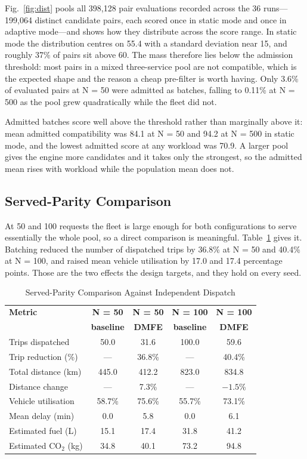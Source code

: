 \documentclass[conference]{IEEEtran}
\begin{document}
Fig.~\ref{fig:dist} pools all 398,128 pair evaluations recorded across the 36 runs---199,064 distinct candidate pairs, each scored once in static mode and once in adaptive mode---and shows how they distribute across the score range. In static mode the distribution centres on 55.4 with a standard deviation near 15, and roughly 37\% of pairs sit above 60. The mass therefore lies below the admission threshold: most pairs in a mixed three-service pool are not compatible, which is the expected shape and the reason a cheap pre-filter is worth having. Only 3.6\% of evaluated pairs at N = 50 were admitted as batches, falling to 0.11\% at N = 500 as the pool grew quadratically while the fleet did not.

Admitted batches score well above the threshold rather than marginally above it: mean admitted compatibility was 84.1 at N = 50 and 94.2 at N = 500 in static mode, and the lowest admitted score at any workload was 70.9. A larger pool gives the engine more candidates and it takes only the strongest, so the admitted mean rises with workload while the population mean does not.

\subsection{Served-Parity Comparison}
At 50 and 100 requests the fleet is large enough for both configurations to serve essentially the whole pool, so a direct comparison is meaningful. Table~\ref{tab:par} gives it. Batching reduced the number of dispatched trips by 36.8\% at N = 50 and 40.4\% at N = 100, and raised mean vehicle utilisation by 17.0 and 17.4 percentage points. Those are the two effects the design targets, and they hold on every seed.

\begin{table}[t]
\centering
\caption{Served-Parity Comparison Against Independent Dispatch}
\label{tab:par}
\begin{tabular}{lcccc}
\toprule
\textbf{Metric} & \textbf{N = 50} & \textbf{N = 50} & \textbf{N = 100} & \textbf{N = 100} \\
& \textbf{baseline} & \textbf{DMFE} & \textbf{baseline} & \textbf{DMFE} \\
\midrule
Trips dispatched & 50.0 & 31.6 & 100.0 & 59.6 \\
Trip reduction (\%) & --- & 36.8\% & --- & 40.4\% \\
Total distance (km) & 445.0 & 412.2 & 823.0 & 834.8 \\
Distance change & --- & 7.3\% & --- & $-1.5$\% \\
Vehicle utilisation & 58.7\% & 75.6\% & 55.7\% & 73.1\% \\
Mean delay (min) & 0.0 & 5.8 & 0.0 & 6.1 \\
Estimated fuel (L) & 15.1 & 17.4 & 31.8 & 41.2 \\
Estimated CO$_2$ (kg) & 34.8 & 40.1 & 73.2 & 94.8 \\
\bottomrule
\end{tabular}
\end{table}
\end{document}
